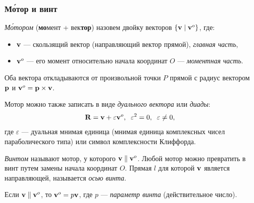 \begin{frame}
  \frametitle{М\'отор и винт}
  \emph{М\'отором} (\textbf{мо}мент + век\textbf{тор}) назовем двойку векторов $\{\vb{v} \mid \vb{v}^{o}\}$, где:
  \begin{itemize}
    \item $\vb{v}$ — скользящий вектор (направляющий вектор прямой), \emph{главная часть},
    \item $\vb{v}^{o}$ — его момент относительно начала координат $O$ — \emph{моментная часть}.
  \end{itemize}
  Оба вектора откладываются от произвольной точки $P$ прямой с радиус вектором $\vb{p}$ и $\vb{v}^{o} = \vb{p} \times \vb{v}$.

  Мотор можно также записать в виде \emph{дуального вектора} или \emph{диады}:
  \begin{equation*}
    \vb{R} = \vb{v} + \varepsilon\vb{v}^{o}, \;\;
    \varepsilon^2 = 0, \;\; \varepsilon \not = 0,
  \end{equation*}
  где $\varepsilon$ — дуальная мнимая единица (мнимая единица комплексных чисел параболического типа) или символ комплексности Клиффорда.

  \emph{Винтом} называют мотор, у которого $\vb{v} \parallel \vb{v}^{o}$. Любой мотор можно превратить в винт путем замены начала координат $O$. Прямая $l$ для которой $\vb{v}$ является направляющей, называется \emph{осью винта}.

  Если $\vb{v} \parallel \vb{v}^{o}$, то $\vb{v}^{o} = p \vb{v}$, где $p$ — \emph{параметр винта} (действительное число).
\end{frame}

